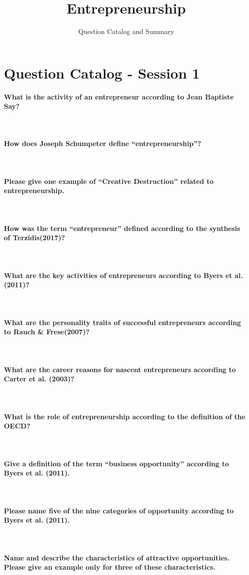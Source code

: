 \documentclass[10pt,a4paper,noendnumber=true]{scrartcl}
\title{Entrepreneurship}
\subtitle{Question Catalog and Summary}
\author{}
\newcommand{\properparagraph}[1]{\paragraph{\textcolor{Emerald}{#1}}\mbox{}\\}
\begin{document}
\maketitle

\section{Question Catalog - Session 1}

\properparagraph{What is the activity of an entrepreneur according to Jean Baptiste Say?}
\properparagraph{How does Joseph Schumpeter define "`entrepreneurship"'?}
\properparagraph{Please give one example of "`Creative Destruction"' related to entrepreneurship.}
\properparagraph{How was the term "`entrepreneur"' defined according to the synthesis of Terzidis(2017)?}
\properparagraph{What are the key activities of entrepreneurs according to Byers et al. (2011)?}
\properparagraph{What are the personality traits of successful entrepreneurs according to Rauch \& Frese(2007)?}
\properparagraph{What are the career reasons for nascent entrepreneurs according to Carter et al. (2003)?}
\properparagraph{What is the role of entrepreneurship according to the definition of the OECD?}
\properparagraph{Give a definition of the term "`business opportunity"' according to Byers et al. (2011).}
\properparagraph{Please name five of the nine categories of opportunity according to Byers et al. (2011).}
\properparagraph{Name and describe the characteristics of attractive opportunities. Please give an example only for three of these characteristics.}
\end{document}
